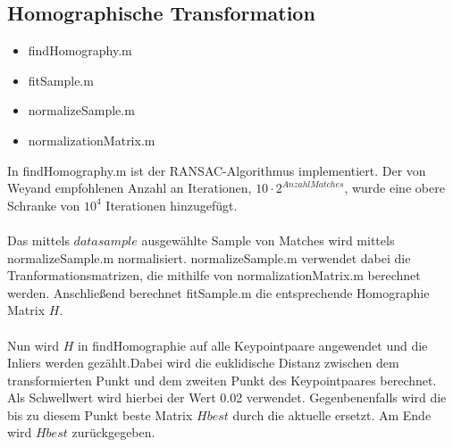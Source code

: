 \documentclass[deutsch]{scrartcl}
\begin{document}
\subsection{Homographische Transformation}
\begin{itemize}
	\item findHomography.m 
	\item fitSample.m 
	\item normalizeSample.m
	\item normalizationMatrix.m
\end{itemize}
In findHomography.m ist der RANSAC-Algorithmus implementiert. Der von Weyand\cite{pandemo} empfohlenen Anzahl an Iterationen, $10 \cdot 2^{AnzahlMatches}$, wurde eine obere Schranke von $10^4$ Iterationen hinzugefügt.\\\\
Das mittels $datasample$ ausgewählte Sample von Matches wird mittels normalizeSample.m normalisiert. normalizeSample.m verwendet dabei die Tranformationsmatrizen, die mithilfe von normalizationMatrix.m berechnet werden. Anschließend berechnet fitSample.m die entsprechende Homographie Matrix $H$. \\\\
Nun wird $H$ in findHomographie auf alle Keypointpaare angewendet und die Inliers werden gezählt.Dabei wird die euklidische Distanz zwischen dem transformierten Punkt und dem zweiten Punkt des Keypointpaares berechnet. Als Schwellwert wird hierbei der Wert 0.02 verwendet. Gegenbenenfalls wird die bis zu diesem Punkt beste Matrix $Hbest$ durch die aktuelle ersetzt. Am Ende wird $Hbest$ zurückgegeben.
\end{document}

